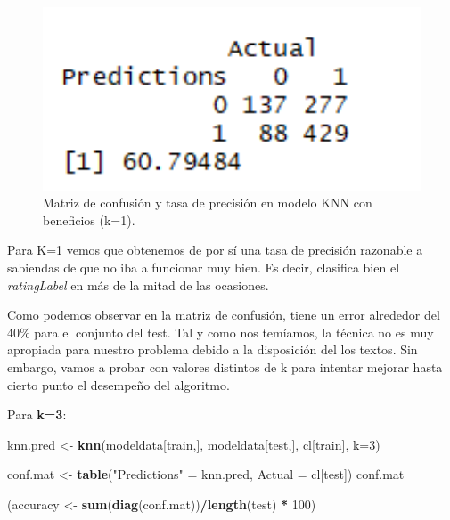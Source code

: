 \documentclass[spanish,]{article}
\newenvironment{Shaded}{\begin{snugshade}}{\end{snugshade}}
\newcommand{\KeywordTok}[1]{\textcolor[rgb]{0.13,0.29,0.53}{\textbf{#1}}}
\newcommand{\DataTypeTok}[1]{\textcolor[rgb]{0.13,0.29,0.53}{#1}}
\newcommand{\DecValTok}[1]{\textcolor[rgb]{0.00,0.00,0.81}{#1}}
\newcommand{\StringTok}[1]{\textcolor[rgb]{0.31,0.60,0.02}{#1}}
\newcommand{\OperatorTok}[1]{\textcolor[rgb]{0.81,0.36,0.00}{\textbf{#1}}}
\newcommand{\NormalTok}[1]{#1}
\begin{document}
\begin{figure}[h]
    \centering
    \includegraphics[width=1\textwidth]{figuras/KNN/benefits_k1.png}
    \caption{Matriz de confusión y tasa de precisión en modelo KNN con beneficios (k=1).}
    \label{fig:KNN:benefitsK1}
\end{figure}

Para K=1 vemos que obtenemos de por sí una tasa de precisión razonable a
sabiendas de que no iba a funcionar muy bien. Es decir, clasifica bien
el \emph{ratingLabel} en más de la mitad de las ocasiones.

Como podemos observar en la matriz de confusión, tiene un error
alrededor del 40\% para el conjunto del test. Tal y como nos temíamos,
la técnica no es muy apropiada para nuestro problema debido a la
disposición del los textos. Sin embargo, vamos a probar con valores
distintos de k para intentar mejorar hasta cierto punto el desempeño del
algoritmo.

Para \textbf{k=3}:

\begin{Shaded}
\begin{Highlighting}[]
\NormalTok{knn.pred <-}\StringTok{ }\KeywordTok{knn}\NormalTok{(modeldata[train,], modeldata[test,], cl[train], }\DataTypeTok{k=}\DecValTok{3}\NormalTok{) }

\NormalTok{conf.mat <-}\StringTok{ }\KeywordTok{table}\NormalTok{(}\StringTok{"Predictions"}\NormalTok{ =}\StringTok{ }\NormalTok{knn.pred, }\DataTypeTok{Actual =}\NormalTok{ cl[test])}
\NormalTok{conf.mat}

\NormalTok{(accuracy <-}\StringTok{ }\KeywordTok{sum}\NormalTok{(}\KeywordTok{diag}\NormalTok{(conf.mat))}\OperatorTok{/}\KeywordTok{length}\NormalTok{(test) }\OperatorTok{*}\StringTok{ }\DecValTok{100}\NormalTok{)}
\end{Highlighting}
\end{Shaded}
\end{document}
